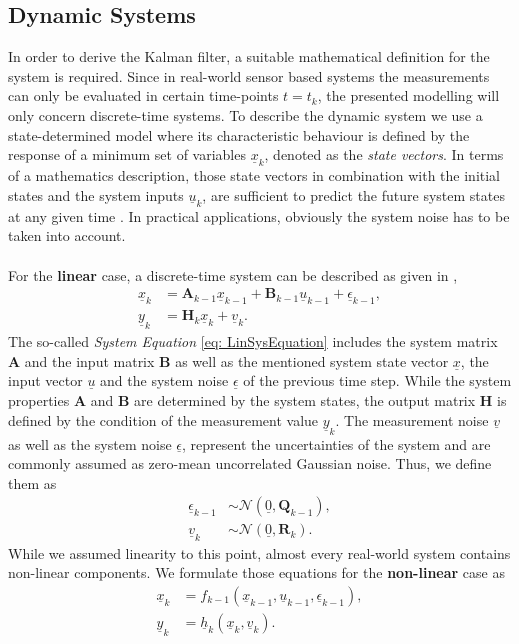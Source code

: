 \documentclass[english]{isasthesis}
\begin{document}
			\subsection{Dynamic Systems} \label{dynamic systems}
			In order to derive the Kalman filter, a suitable mathematical definition for the system is required. Since in real-world sensor based systems the measurements can only be evaluated in certain time-points \(t = t_k \), the presented modelling will only concern discrete-time systems. To describe the dynamic system we use a state-determined model where its characteristic behaviour is defined by the response of a minimum set of variables \(\underline{x}_k\), denoted as the \textit{state vectors}. In terms of a mathematics description, those state vectors in combination with the initial states and the system inputs \(\underline{u}_k\), are sufficient to predict the future system states at any given time \cite{rowell2002state}. In practical applications, obviously the system noise has to be taken into account.\\ \\
			For the \textbf{linear} case, a discrete-time system can be described as given in \cite{simon2006optimal},
			\begin{align}\label{eq: LinSysEquation}
			\underline{x}_k &= \mathbf{A}_{k-1}\underline{x}_{k-1}+\mathbf{B}_{k-1}\underline{u}_{k-1}+\underline{\epsilon}_{k-1}, \\
			\underline{y}_k &= \mathbf{H}_{k}\underline{x}_{k}+\underline{v}_k.\label{eq: LinMeasEquation}
			\end{align}
			The so-called \textit{System Equation} \eqref{eq: LinSysEquation} includes the system matrix \(\mathbf{A}\) and the input matrix \(\mathbf{B}\) as well as the mentioned system state vector \(\underline{x}\), the input vector \(\underline{u}\) and the system noise \(\underline{\epsilon}\) of the previous time step. While the system properties \(\mathbf{A}\) and \(\mathbf{B}\) are determined by the system states, the output matrix $\mathbf{H}$ is defined by the condition of the measurement value $\underline{y}_k$. The measurement noise $\underline{v}$ as well as the system noise $\underline{\epsilon}$, represent the uncertainties of the system and are commonly assumed as zero-mean uncorrelated Gaussian noise. Thus, we define them as
			\begin{equation}
			\begin{aligned}\label{eq:noise}
					\underline{\epsilon}_{k-1} &\sim \mathcal{N}(\underline{0},\mathbf{Q}_{k-1}), \\
                    \underline{v}_{k} &\sim \mathcal{N}(\underline{0},\mathbf{R}_k).
			\end{aligned}
			\end{equation}
While we assumed linearity to this point, almost every real-world system contains non-linear components. We formulate those equations for the \textbf{non-linear} case as
\begin{align} \label{eq: NonLinSysEquation}
		\underline{x}_{k} &= f_{k-1}(\underline{x}_{k-1},\underline{u}_{k-1},\underline{\epsilon}_{k-1}), \\
        \underline{y}_{k} &= \underline{h}_k(\underline{x}_k, \underline{v}_k).\label{eq: NonLinMeasEquation}
\end{align}
\end{document}
